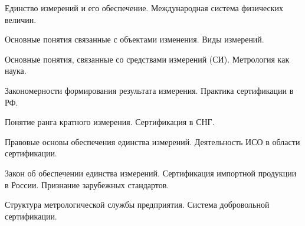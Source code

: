 \documentclass[
	14pt,
	a4paper,
	]
	{scrartcl}
\begin{document}
\shapk
{}
\setcounter{zad}{0}

\vfill
\z Единство измерений и его обеспечение.
 \vfill
\z Международная система физических величин. \vfill

\vfill

\newpage


\shapk
{}
\setcounter{zad}{0}

\vfill
\z Основные понятия связанные с объектами изменения.
 \vfill
\z Виды измерений.
 \vfill

\vfill

\newpage


\shapk
{}
\setcounter{zad}{0}

\vfill
\z Основные понятия, связанные со средствами измерений (СИ).
 \vfill
\z Метрология как наука.
 \vfill

\vfill

\newpage


\shapk
{}
\setcounter{zad}{0}

\vfill
\z Закономерности формирования результата измерения.
 \vfill
\z Практика сертификации в РФ.
 \vfill

\vfill

\newpage


\shapk
{}
\setcounter{zad}{0}

\vfill
\z Понятие ранга кратного измерения.
 \vfill
\z Сертификация в СНГ.
 \vfill

\vfill

\newpage


\shapk
{}
\setcounter{zad}{0}

\vfill
\z Правовые основы обеспечения единства измерений.
 \vfill
\z Деятельность ИСО в области сертификации.
 \vfill

\vfill

\newpage


\shapk
{}
\setcounter{zad}{0}

\vfill
\z Закон об обеспечении единства измерений.
 \vfill
\z Сертификация импортной продукции в России. Признание зарубежных стандартов.
 \vfill

\vfill

\newpage


\shapk
{}
\setcounter{zad}{0}

\vfill
\z Структура метрологической службы предприятия.
 \vfill
\z Система добровольной сертификации.
 \vfill
\end{document}
